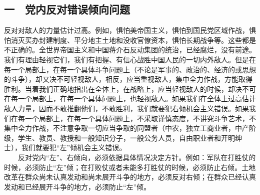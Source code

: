 \documentclass[cn,11pt,chinese]{elegantbook}
\def\myformat#1{\hfil\hfil #1}
\begin{document}
\subsection*{\myformat{一　党内反对错误倾向问题}}
反对对敌人的力量估计过高。例如，惧怕美帝国主义，惧怕到国民党区域作战，惧怕消灭买办封建制度、平分地主土地和没收官僚资本，惧怕长期战争等。这些都是不正确的。全世界帝国主义和中国蒋介石反动集团的统治，已经腐烂，没有前途。我们有理由轻视它们，我们有把握、有信心战胜中国人民的一切内外敌人。但是在每一个局部上，在每一个具体斗争问题上（不论是军事的、政治的、经济的或思想的斗争），却又决不可轻视敌人，相反，应当重视敌人，集中全力作战，方能取得胜利。当着我们正确地指出在全体上，在战略上，应当轻视敌人的时候，却决不可在每一个局部上，在每一个具体问题上，也轻视敌人。如果我们在全体上过高估计敌人力量，因而不敢推翻他们，不敢胜利，我们就要犯右倾机会主义错误。如果我们在每一个局部上，在每一个具体问题上，不采取谨慎态度，不讲究斗争艺术，不集中全力作战，不注意争取一切应当争取的同盟者（中农，独立工商业者，中产阶级，学生、教员、教授和一般知识分子，一般公务人员，自由职业者和开明绅士），我们就要犯“左”倾机会主义错误。\\
　　反对党内“左”、右倾向，必须依据具体情况决定方针。例如：军队在打胜仗的时候，必须防止“左”倾；在打败仗或者未能多打胜仗的时候，必须防止右倾。土地改革在群众尚未认真发动和尚未展开斗争的地方，必须反对右倾；在群众已经认真发动和已经展开斗争的地方，必须防止“左”倾。\\
\end{document}
